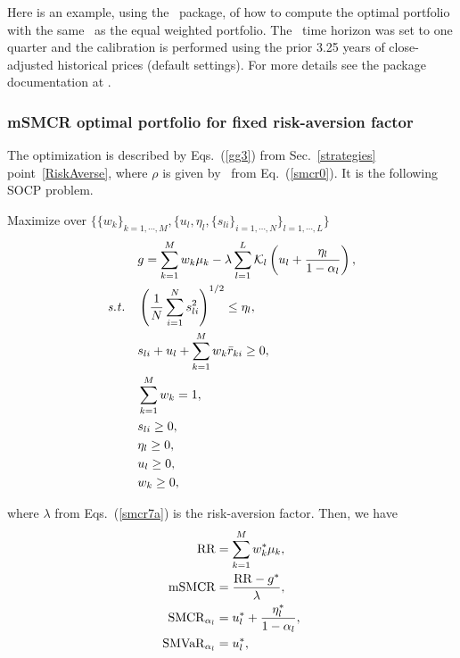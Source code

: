\bigskip
\noindent Here is an example, using the \azapy\ package, of how to compute the optimal portfolio
with the same \mSMCR\ as the equal weighted portfolio.
The \mSMCR\ time horizon was set to one quarter and the calibration is performed using the prior 3.25 years of
close-adjusted historical prices (default settings).
For more details see the package documentation at \azapydoc.



\BackToContents

\subsubsection{mSMCR optimal portfolio for fixed risk-aversion factor}
The optimization is described by Eqs.~(\ref{gg3}) from Sec.~\ref{strategies} point~\ref{RiskAverse},
where $\rho$ is given by \mSMCR\ from Eq.~(\ref{smcr0}).
It is the following SOCP problem.

\bigskip
\noindent Maximize over $\{ \{w_k\}_{k=1,\cdots,M}, \{ u_l, \eta_l, \{s_{li}\}_{i=1,\cdots,N} \}_{l=1,\cdots,L}\}$
\begin{subequations}\label{smcr7}
\begin{align}
    &g = \sum_{k=1}^M w_k\mu_k - \lambda \sum_{l=1}^L \cK_l \left( u_l + \frac{\eta_l}{1 - \alpha_l}  \right), \label{smcr7a} \\
    \st &\left( \frac{1}{N} \sum_{i=1}^N s_{li}^2 \right)^{1/2} \leq \eta_l, \label{smcr7b} \\
        &s_{li} + u_l + \sum_{k=1}^M w_k \br_{ki} \geq 0, \label{smcr7c} \\\
        &\sum_{k=1}^M w_k = 1, \label{smcr7d} \\
        &s_{li} \geq 0, \label{smcr7e} \\
        &\eta_l \geq 0, \label{smcr7g} \\
        &u_l \geq 0, \label{smcr7h} \\
        &w_k \geq 0, \label{smcr7f}
\end{align}
\end{subequations}

\noindent where $\lambda$ from Eqs.~(\ref{smcr7a}) is the risk-aversion factor.
Then, we have
\begin{subequations}\label{smcr8}
\begin{align}
    \RR &= \sum_{k=1}^M w_k^* \mu_k, \label{smcr8a} \\
    \mSMCR &= \frac{\RR - g^*}{\lambda}, \label{smcr8b} \\
    \SMCR_{\alpha_l} &= u_l^* + \frac{\eta_l^*}{1-\alpha_l} , \label{smcr8c} \\
    \SMVaR_{\alpha_l} &= u_l^*, \label{smcr8d}
\end{align}
\end{subequations}

